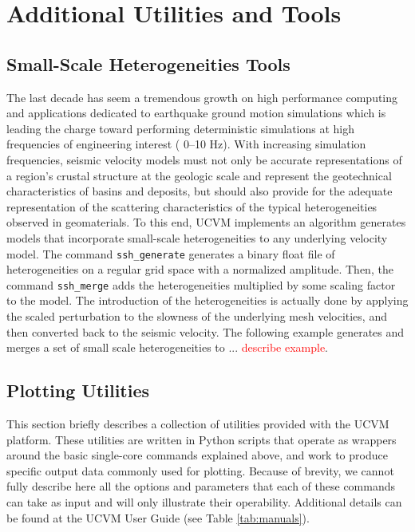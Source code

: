 
\section{Additional Utilities and Tools}
\label{sec:utilities}

\subsection{Small-Scale Heterogeneities Tools}

The last decade has seem a tremendous growth on high performance computing and applications dedicated to earthquake ground motion simulations which is leading the charge toward performing deterministic simulations at high frequencies of engineering interest (\fmax{} 0--10 Hz). With increasing simulation frequencies, seismic velocity models must not only be accurate representations of a region's crustal structure at the geologic scale and represent the geotechnical characteristics of basins and deposits, but should also provide for the adequate representation of the scattering characteristics of the typical heterogeneities observed in geomaterials. To this end, UCVM implements an algorithm generates models that incorporate small-scale heterogeneities to any underlying velocity model. The command \texttt{ssh\_generate} generates a binary float file of heterogeneities on a regular grid space with a normalized amplitude. Then, the command \texttt{ssh\_merge} adds the heterogeneities multiplied by some scaling factor to the model. The introduction of the heterogeneities is actually done by applying the scaled perturbation to the slowness of the underlying mesh velocities, and then converted back to the seismic velocity. The following example generates and merges a set of small scale heterogeneities to ... \textcolor{red}{describe example}.

\subsection{Plotting Utilities}

This section briefly describes a collection of utilities provided with the UCVM platform. These utilities are written in Python scripts that operate as wrappers around the basic single-core commands explained above, and work to produce specific output data commonly used for plotting. Because of brevity, we cannot fully describe here all the options and parameters that each of these commands can take as input and will only illustrate their operability. Additional details can be found at the UCVM User Guide (see Table \ref{tab:manuals}).

